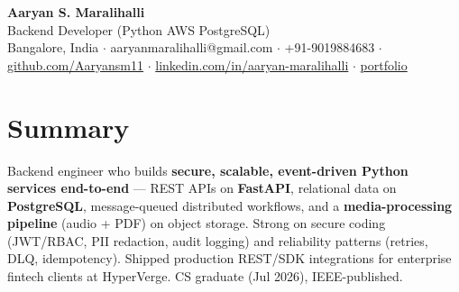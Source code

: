 \documentclass[10pt,a4paper]{article}
\begin{document}
\vspace*{-1cm}
\begin{center}
{\LARGE\bfseries Aaryan S. Maralihalli}\\[0.5em]
{\large Backend Developer (Python  \textbar{}  AWS  \textbar{}  PostgreSQL)}\\[0.3em]
Bangalore, India $\cdot$ aaryanmaralihalli@gmail.com $\cdot$ +91-9019884683 $\cdot$ \href{https://github.com/Aaryansm11}{github.com/Aaryansm11} $\cdot$ \href{https://linkedin.com/in/aaryan-maralihalli}{linkedin.com/in/aaryan-maralihalli} $\cdot$ \href{https://portfolio-zeta-ten-85.vercel.app}{portfolio}
\end{center}\vspace{0.4ex}
\section*{Summary}
Backend engineer who builds \textbf{secure, scalable, event-driven Python services end-to-end} --- REST APIs on \textbf{FastAPI}, relational data on \textbf{PostgreSQL}, message-queued distributed workflows, and a \textbf{media-processing pipeline} (audio + PDF) on object storage. Strong on secure coding (JWT/RBAC, PII redaction, audit logging) and reliability patterns (retries, DLQ, idempotency). Shipped production REST/SDK integrations for enterprise fintech clients at HyperVerge. CS graduate (Jul 2026), IEEE-published.\par\vspace{2pt}
\end{document}
